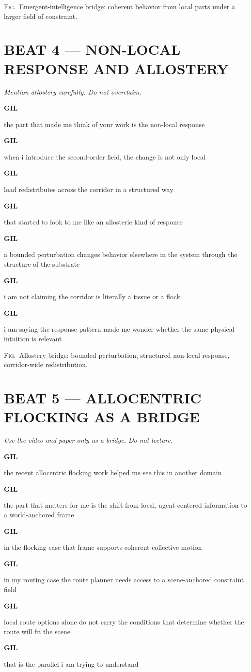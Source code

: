 \documentclass[11pt,letterpaper]{article}
\newcommand{\gil}[1]{\par\smallskip\textbf{GIL}\par #1}
\newcommand{\context}[1]{\textit{#1}\par\smallskip}
\newcommand{\figdesc}[1]{\par\smallskip\textsc{Fig.}\ #1\par}
\begin{document}
\figdesc{Emergent-intelligence bridge: coherent behavior from local parts under a larger field of constraint.}

\section*{BEAT 4 --- NON-LOCAL RESPONSE AND ALLOSTERY}

\context{Mention allostery carefully. Do not overclaim.}

\gil{the part that made me think of your work is the non-local response}

\gil{when i introduce the second-order field, the change is not only local}

\gil{load redistributes across the corridor in a structured way}

\gil{that started to look to me like an allosteric kind of response}

\gil{a bounded perturbation changes behavior elsewhere in the system through the structure of the substrate}

\gil{i am not claiming the corridor is literally a tissue or a flock}

\gil{i am saying the response pattern made me wonder whether the same physical intuition is relevant}

\figdesc{Allostery bridge: bounded perturbation, structured non-local response, corridor-wide redistribution.}

\section*{BEAT 5 --- ALLOCENTRIC FLOCKING AS A BRIDGE}

\context{Use the video and paper only as a bridge. Do not lecture.}

\gil{the recent allocentric flocking work helped me see this in another domain}

\gil{the part that matters for me is the shift from local, agent-centered information to a world-anchored frame}

\gil{in the flocking case that frame supports coherent collective motion}

\gil{in my routing case the route planner needs access to a scene-anchored constraint field}

\gil{local route options alone do not carry the conditions that determine whether the route will fit the scene}

\gil{that is the parallel i am trying to understand}
\end{document}
